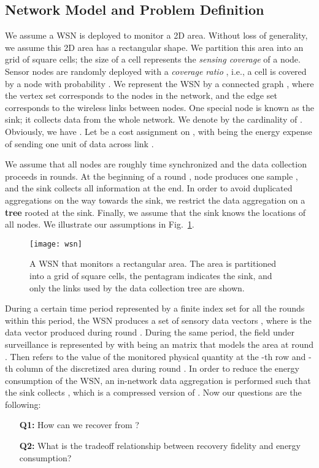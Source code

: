 \documentclass[conference]{IEEEtran}
\begin{document}
  \subsection{Network Model and Problem Definition} \label{sec:netmodel}
We assume a WSN is deployed to monitor a 2D area. Without loss of generality, we assume this 2D area has a rectangular shape. We partition this area into an  grid of square cells; the size of a cell represents the \textit{sensing coverage} of a node. Sensor nodes are randomly deployed with a \textit{coverage ratio} , i.e., a cell is covered by a node with probability . We represent the WSN by a connected graph , where the vertex set  corresponds to the nodes in the network, and the edge set  corresponds to the wireless links between nodes. One special node  is known as the sink; it collects data from the whole network. We denote by  the cardinality of . Obviously, we have . Let  be a cost assignment on , with  being the energy expense of sending one unit of data across link .

    We assume that all nodes are roughly time synchronized and the data collection proceeds in rounds. At the beginning of a round , node  produces one sample , and the sink collects all information at the end. In order to avoid duplicated aggregations on the way towards the sink, we restrict the data aggregation on a \textbf{tree} rooted at the sink. Finally, we assume that the sink knows the locations of all nodes. We illustrate our assumptions in Fig.~\ref{fig:wsn}.
    \begin{figure}[h]
      \centering
      \texttt{[image: wsn]}
      \caption{A WSN that monitors a rectangular area. The area is partitioned into a grid of square cells, the pentagram indicates the sink, and only the links used by the data collection tree are shown.} \label{fig:wsn}
\end{figure}

    During a certain time period represented by a finite index set  for all the rounds within this period, the WSN produces a set of sensory data vectors , where  is the data vector produced during round . During the same period, the field under surveillance is represented by  with  being an  matrix that models the area at round . Then  refers to the value of the monitored physical quantity at the -th row and -th column of the discretized area during round . In order to reduce the energy consumption of the WSN, an in-network data aggregation is performed such that the sink collects , which is a compressed version of . Now our questions are the following:
    \begin{itemize}
\item[\textbf{Q1:}] How can we recover  from ?
\item[\textbf{Q2:}] What is the tradeoff relationship between recovery fidelity and energy consumption?
\end{itemize}
\end{document}
